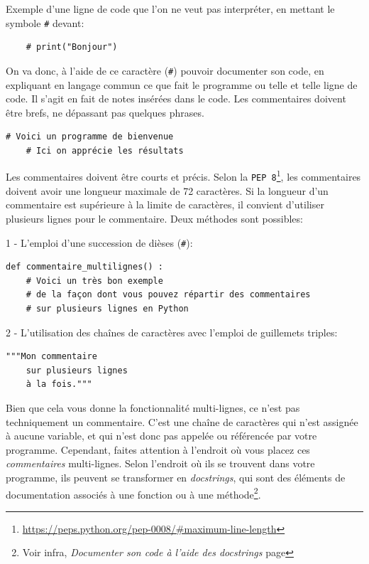 \documentclass[a4paper,11pt]{book}
\begin{document}
Exemple d'une ligne de code que l'on ne veut pas interpréter, en mettant le symbole \texttt{\#} devant:
\begin{verbatim}
    # print("Bonjour")
\end{verbatim}
\medskip

On va donc, à l'aide de ce caractère (\texttt{\#}) pouvoir documenter son code, en expliquant en langage commun ce que fait le programme ou telle et telle ligne de code. Il s'agit en fait de notes insérées dans le code. Les commentaires doivent être brefs, ne dépassant pas quelques phrases.
\begin{lstlisting}[caption=Exemple de commentaire]
    # Voici un programme de bienvenue
    # Ici on apprécie les résultats
\end{lstlisting}
\medskip

Les commentaires doivent être courts et précis. Selon la \texttt{PEP 8}\footnote{\url{https://peps.python.org/pep-0008/\#maximum-line-length}}, les commentaires doivent avoir une longueur maximale de 72 caractères. Si la longueur d'un commentaire est supérieure à la limite de caractères, il convient d'utiliser plusieurs lignes pour le commentaire. Deux méthodes sont possibles:
\medskip

1 - L'emploi d'une succession de dièses (\texttt{\#}):
\begin{lstlisting}
def commentaire_multilignes() :
    # Voici un très bon exemple
    # de la façon dont vous pouvez répartir des commentaires
    # sur plusieurs lignes en Python
\end{lstlisting} 
\medskip

2 - L'utilisation des chaînes de caractères avec l'emploi de guillemets triples:
\begin{lstlisting}[caption=Commentaire sur plusieurs lignes]
    """Mon commentaire
    sur plusieurs lignes
    à la fois."""
\end{lstlisting}
\medskip

Bien que cela vous donne la fonctionnalité multi-lignes, ce n'est pas techniquement un commentaire. C'est une chaîne de caractères qui n'est assignée à aucune variable, et qui n'est donc pas appelée ou référencée par votre programme. Cependant, faites attention à l'endroit où vous placez ces \og{} \textit{commentaires}\fg{} multi-lignes. Selon l'endroit où ils se trouvent dans votre programme, ils peuvent se transformer en \textit{docstrings}, qui sont des éléments de documentation associés à une fonction ou à une méthode\footnote{Voir infra, \og \textit{Documenter son code à l'aide des docstrings}\fg{} page \pageref{documenteravecdocstring}}. 
\medskip
\end{document}

